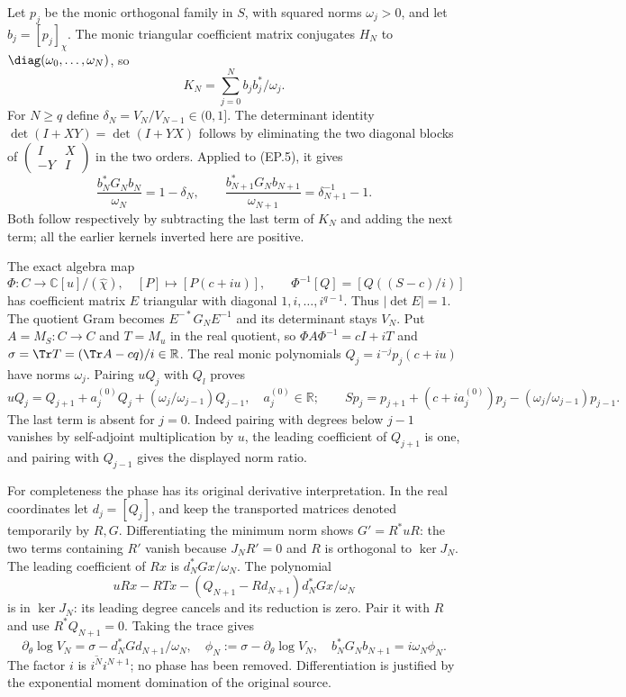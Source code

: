 \documentclass[11pt,a4paper]{article}
\newcommand{\C}{\mathbb C}
\newcommand{\R}{\mathbb R}
\begin{document}
Let $p_j$ be the monic orthogonal family in $S$, with squared norms
$\omega_j>0$, and let $b_j=[p_j]_\chi$. The monic triangular
coefficient matrix conjugates $H_N$ to
$\diag(\omega_0,\ldots,\omega_N)$, so
\[
 K_N=\sum_{j=0}^N b_jb_j^*/\omega_j.\tag{EP.5}
\]
For $N\ge q$ define $\delta_N=V_N/V_{N-1}\in(0,1]$.
The determinant identity $\det(I+XY)=\det(I+YX)$ follows by
eliminating the two diagonal blocks of
$\left(\begin{smallmatrix}I&X\\-Y&I\end{smallmatrix}\right)$
in the two orders. Applied to (EP.5), it gives
\[
 \frac{b_N^*G_Nb_N}{\omega_N}=1-\delta_N,\qquad
 \frac{b_{N+1}^*G_Nb_{N+1}}{\omega_{N+1}}
 =\delta_{N+1}^{-1}-1.\tag{EP.6}
\]
Both follow respectively by subtracting the last term of $K_N$ and
adding the next term; all the earlier kernels inverted here are positive.

The exact algebra map
\[
 \Phi:C\longrightarrow\C[u]/(\widehat\chi),\quad
 [P]\longmapsto[P(c+iu)],\qquad
 \Phi^{-1}[Q]=[Q((S-c)/i)]\tag{EP.7}
\]
has coefficient matrix $E$ triangular with diagonal $1,i,\ldots,i^{q-1}$.
Thus $|\det E|=1$. The quotient Gram becomes
$E^{-*}G_NE^{-1}$ and its determinant stays $V_N$.
Put $A=M_S:C\to C$ and $T=M_u$ in the real quotient, so
$\Phi A\Phi^{-1}=cI+iT$ and
$\sigma=\Tr T=(\Tr A-cq)/i\in\R$.
The real monic polynomials $Q_j=i^{-j}p_j(c+iu)$ have norms
$\omega_j$. Pairing $uQ_j$ with $Q_l$ proves
\[
 uQ_j=Q_{j+1}+a_j^{(0)}Q_j+
       (\omega_j/\omega_{j-1})Q_{j-1},\quad a_j^{(0)}\in\R;
 \qquad
 Sp_j=p_{j+1}+(c+ia_j^{(0)})p_j-
       (\omega_j/\omega_{j-1})p_{j-1}.\tag{EP.8}
\]
The last term is absent for $j=0$. Indeed pairing with degrees below
$j-1$ vanishes by self-adjoint multiplication by $u$, the leading
coefficient of $Q_{j+1}$ is one, and pairing with $Q_{j-1}$ gives
the displayed norm ratio.

For completeness the phase has its original derivative interpretation.
In the real coordinates let $d_j=[Q_j]$, and keep the transported
matrices denoted temporarily by $R,G$. Differentiating the minimum
norm shows $G'=R^*uR$: the two terms containing $R'$ vanish because
$J_NR'=0$ and $R$ is orthogonal to $\ker J_N$. The leading
coefficient of $Rx$ is $d_N^*Gx/\omega_N$. The polynomial
\[
 uRx-RTx-(Q_{N+1}-Rd_{N+1})d_N^*Gx/\omega_N
\]
is in $\ker J_N$: its leading degree cancels and its reduction is zero.
Pair it with $R$ and use $R^*Q_{N+1}=0$. Taking the trace gives
\[
 \partial_\theta\log V_N
 =\sigma-d_N^*Gd_{N+1}/\omega_N,
 \quad \phi_N:=\sigma-\partial_\theta\log V_N,
 \quad b_N^*G_Nb_{N+1}=i\omega_N\phi_N.\tag{EP.9}
\]
The factor $i$ is $\overline{i^N}i^{N+1}$; no phase has been removed.
Differentiation is justified by the exponential moment domination of
the original source.
\end{document}

